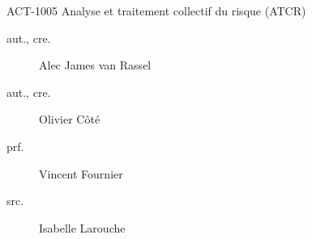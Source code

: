 \begin{contrib}{ACT-1005\: Analyse et traitement collectif du risque (ATCR)}
\begin{description}
	\item[aut., cre.]	Alec James van Rassel
	\item[aut., cre.]	Olivier Côté
	\item[prf.]	Vincent Fournier
	\item[src.]	Isabelle Larouche
\end{description}
\end{contrib}